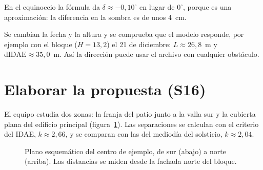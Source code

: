 \documentclass[10pt,a4paper]{article}
\newcounter{res}
\newcommand{\paso}[1]{\par\medskip\noindent{\bfseries\color{titular}#1}\par\smallskip}
\begin{document}
En el equinoccio la fórmula da $\delta\approx-0{,}10^\circ$ en lugar de $0^\circ$, porque es una aproximación: la diferencia en la sombra es de unos 4~cm.

\paso{Paso 13. Prueba de reutilización}
Se cambian la fecha y la altura y se comprueba que el modelo responde, por ejemplo con el bloque ($H=13{,}2$) el 21 de diciembre: $L\approx 26{,}8$~m y $\text{dIDAE}\approx 35{,}0$~m. Así la dirección puede usar el archivo con cualquier obstáculo.

\section{Elaborar la propuesta (S16)}

El equipo estudia dos zonas: la franja del patio junto a la valla sur y la cubierta plana del edificio principal (figura~\ref{fig:plano}). Las separaciones se calculan con el criterio del IDAE, $k\approx 2{,}66$, y se comparan con las del mediodía del solsticio, $k\approx 2{,}04$.

\begin{figure}[!htb]
\centering
{}
\caption{Plano esquemático del centro de ejemplo, de sur (abajo) a norte (arriba). Las distancias se miden desde la fachada norte del bloque.}\label{fig:plano}
\end{figure}
\end{document}
